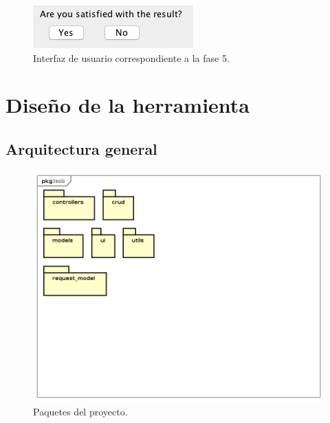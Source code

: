 \begin{figure}[!h] 
	\begin{center}
		\includegraphics [scale=1.00]{imagenes/Interfaz_de_usuario_satisfecho.png}
	\end{center}
	\caption{Interfaz de usuario correspondiente a la fase 5.}
	\label{fig:Interfaz de usuario correspondiente a la fase 5}
\end{figure} 






\section{Diseño de la herramienta}

\subsection{Arquitectura general}

\begin{figure}[!h] 
	\begin{center}
		\includegraphics [scale=0.70]{imagenes/paquetes.png}
	\end{center}
	\caption{Paquetes del proyecto.}
	\label{fig:Paquetes del proyecto}
\end{figure} 

